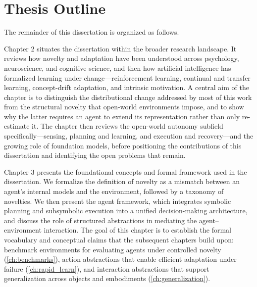 
\section{Thesis Outline}
\label{sec:outline}

The remainder of this dissertation is organized as follows.

Chapter 2 situates the dissertation within the broader research landscape. It reviews how novelty and adaptation have been understood across psychology, neuroscience, and cognitive science, and then how artificial intelligence has formalized learning under change---reinforcement learning, continual and transfer learning, concept-drift adaptation, and intrinsic motivation. A central aim of the chapter is to distinguish the distributional change addressed by most of this work from the structural novelty that open-world environments impose, and to show why the latter requires an agent to extend its representation rather than only re-estimate it. The chapter then reviews the open-world autonomy subfield specifically---sensing, planning and learning, and execution and recovery---and the growing role of foundation models, before positioning the contributions of this dissertation and identifying the open problems that remain.

Chapter 3 presents the foundational concepts and formal framework used in the dissertation. We formalize the definition of novelty as a mismatch between an agent's internal models and the environment, followed by a taxonomy of novelties. We then present the agent framework, which integrates symbolic planning and subsymbolic execution into a unified decision-making architecture, and discuss the role of structured abstractions in mediating the agent--environment interaction. The goal of this chapter is to establish the formal vocabulary and conceptual claims that the subsequent chapters build upon: benchmark environments for evaluating agents under controlled novelty (\cref{ch:benchmarks}), action abstractions that enable efficient adaptation under failure (\cref{ch:rapid_learn}), and interaction abstractions that support generalization across objects and embodiments (\cref{ch:generalization}).

